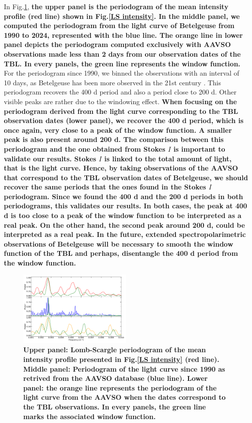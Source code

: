 \documentclass{aa}
\begin{document}
In Fig.\ref{Lomb Scargle AAVSO}, \textbf{the upper panel is the periodogram of the mean intensity profile (red line) shown in Fig.\ref{LS intensity}. In the middle panel, we computed the periodogram from the light curve of Betelgeuse from 1990 to 2024, represented with the blue line. The orange line in lower panel depicts the periodogram computed exclusively with AAVSO observations made less than 2 days from our observation dates of the TBL. In every panels, the green line represents the window function.} For the periodogram since 1990, we binned the observations with an interval of 10 days, as Betelgeuse has been more observed in the 21st century \citep{kiss_variability_2006}. This periodogram  recovers the 400 d period and also a period close to 200 d. Other visible peaks are rather 
due to the windowing effect. \textbf{When focusing on the periodogram derived from the light curve corresponding to the TBL observation dates (lower panel), we recover the 400 d period, which is once again, very close to a peak of the window function. A smaller peak is also present around 200 d. The comparison between this periodogram and the one obtained from Stokes $I$ is important to validate our results. Stokes $I$ is linked to the total amount of light, that is the light curve. Hence, by taking observations of the AAVSO that correspond to the TBL observation dates of Betelgeuse, we should recover the same periods that the ones found in the Stokes $I$ periodogram. Since we found the 400 d and the 200 d periods in both periodograms, this validates our results. In both cases, the peak at 400 d is too close to a peak of the window function to be interpreted as a real peak. On the other hand, the second peak around 200 d, could be interpreted as a real peak. In the future, extended spectropolarimetric observations of Betelgeuse will be necessary to smooth the window function of the TBL and perhaps, disentangle the 400 d period from the window function.}

\begin{figure}[!h]
    \centering
    \includegraphics[width=0.5\textwidth]{Lomb-Scargle AAVSO.pdf}
    \caption{\textbf{Upper panel: Lomb-Scargle periodogram of the mean intensity profile presented in Fig.\ref{LS intensity} (red line).
    Middle panel: Periodogram of the light curve since 1990 as retrived from the AAVSO database (blue line).
    Lower panel: the orange line represents the periodogram of the light curve from the AAVSO when the dates correspond to the TBL observations. In every panels, the green line marks the associated window function. }}
    \label{Lomb Scargle AAVSO}
\end{figure}
\end{document}
